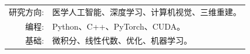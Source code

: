 \renewcommand{\arraystretch}{1.05}

	\begin{tabular}{>{}r>{}p{13.5cm}} 
	 	\textsc{研究方向:}			& 医学人工智能、深度学习、计算机视觉、三维重建。 \\
		\textsc{编程:}    & Python、C++、PyTorch、CUDA。\\
		\textsc{基础:} 		& 微积分、线性代数、优化、机器学习。
	\end{tabular}
